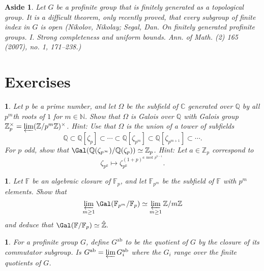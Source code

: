 \documentclass[a4paper,11pt,final,openany]{memoir}
\newtheorem{aside}[X]{Aside}
\newtheorem{exercise}[Y]{}
\theoremstyle{nonumberplain}
\begin{document}
\begin{aside}
\label{ig19a}Let $G$ be a profinite group that is finitely generated as a
topological group. It is a difficult theorem, only recently proved, that every
subgroup of finite index in $G$ is open (Nikolov, Nikolay; Segal, Dan. On
finitely generated profinite groups. I. Strong completeness and uniform
bounds. Ann. of Math. (2) 165 (2007), no. 1, 171--238.)
\end{aside}

\section{Exercises}

\begin{exercise}
\label{x83} Let $p$ be a prime number, and let $\Omega$ be the subfield of
$\mathbb{C}{}$ generated over $\mathbb{Q}{}$ by all $p^{m}$th roots of $1$ for
$m\in\mathbb{N}{}$. Show that $\Omega$ is Galois over $\mathbb{Q}{}$ with
Galois group $\mathbb{Z}{}_{p}^{\times}=\varprojlim
(\mathbb{Z}{}/p^{m}\mathbb{Z}{})^{\times}$. Hint: Use that $\Omega$ is the
union of a tower of subfields
\[
\mathbb{Q}{}\subset\mathbb{Q}{}[\zeta_{p}]\subset\cdots\subset\mathbb{Q}%
{}[\zeta_{p^{m}}]\subset\mathbb{Q}{}[\zeta_{p^{m+1}}]\subset\cdots.
\]
For $p$ odd, show that $\Gal(\mathbb{Q}(\zeta_{p^{\infty}})/\mathbb{Q}%
(\zeta_{p}))\simeq\mathbb{Z}_{p}$. Hint: Let $a\in\mathbb{Z}_{p}$ correspond
to \[\zeta_{p^{k}}\mapsto\zeta_{p^{k}}^{(1+p)^{a\bmod p^{k-1}}}.\]
\end{exercise}

\begin{exercise}
\label{x84} Let $\mathbb{F}{}$ be an algebraic closure of $\mathbb{F}_{p}$,
and let $\mathbb{F}{}_{p^{m}}$ be the subfield of $\mathbb{F}{}$ with $p^{m}$
elements. Show that
\[
\varprojlim_{m\geq1}\Gal(\mathbb{F}{}_{p^{m}}/\mathbb{F}{}_{p})\simeq
\varprojlim_{m\geq1}\mathbb{Z}{}/m\mathbb{Z}%
\]
and deduce that $\Gal(\mathbb{F}{}/\mathbb{F}{}_{p})\simeq{}\mathbb{\hat{Z}}%
{}.$
\end{exercise}

\begin{exercise}
For a profinite group $G$, define $G^{\mathrm{ab}}$ to be the quotient of $G$
by the closure of its commutator subgroup. Is $G^{\mathrm{ab}}=\varprojlim
G_{i}^{\mathrm{ab}}$ where the $G_{i}$ range over the finite quotients of
$G$.

\end{exercise}
\end{document}
